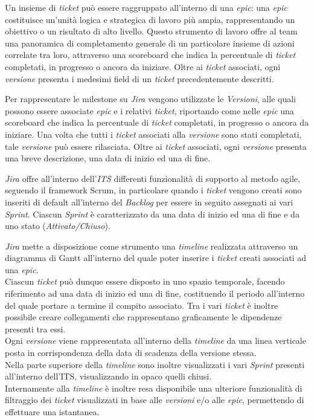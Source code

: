 \documentclass[10pt, a4paper]{article}
\begin{document}
Un insieme di \textit{ticket} può essere raggruppato all'interno di una \textit{epic}: una \textit{epic} costituisce un'unità 
logica e strategica di lavoro più ampia, rappresentando un obiettivo o un risultato di alto livello. Questo strumento di lavoro offre
al team una panoramica di completamento generale di un particolare insieme di azioni correlate tra loro, attraverso una 
scoreboard che indica la percentuale di \textit{ticket} completati, in progresso o ancora da iniziare.
Oltre ai \textit{ticket} associati, ogni \textit{versione} presenta i medesimi field di un \textit{ticket} precedentemente descritti.

Per rappresentare le milestone su \textit{Jira} vengono utilizzate le \textit{Versioni}, alle quali possono essere associate \textit{epic}
e i relativi \textit{ticket}, riportando come nelle \textit{epic} una scoreboard che indica la percentuale di \textit{ticket} completati, in progresso o ancora da iniziare.
Una volta che tutti i \textit{ticket} associati alla \textit{versione} sono stati completati, tale \textit{versione} può essere rilasciata.
Oltre ai \textit{ticket} associati, ogni \textit{versione} presenta una breve descrizione, una data di inizio ed una di fine.

\textit{Jira} offre all'interno dell'\textit{ITS} differenti funzionalità di supporto al metodo agile, seguendo il framework Scrum, in particolare
quando i \textit{ticket} vengono creati sono inseriti di default all'interno del \textit{Backlog} per essere in seguito
assegnati ai vari \textit{Sprint}. 
Ciascun \textit{Sprint} è caratterizzato da una data di inizio ed una di fine e da uno stato (\textit{Attivato/Chiuso}).

\textit{Jira} mette a disposizione come strumento una \textit{timeline} realizzata attraverso un diagramma di Gantt all'interno del quale poter inserire i \textit{ticket}
creati associati ad una \textit{epic}.\\
Ciascun \textit{ticket} può dunque essere disposto in uno spazio temporale, facendo riferimento ad una data di inizio ed una di fine, costituendo il periodo
all'interno del quale portare a termine il compito associato. Tra i vari \textit{ticket} è inoltre possibile creare collegamenti che rappresentano graficamente 
le dipendenze presenti tra essi.\\
Ogni \textit{versione} viene rappresentata all'interno della \textit{timeline} da una linea verticale posta in corrispondenza della data di scadenza
della versione stessa.\\
Nella parte superiore della \textit{timeline} sono inoltre visualizzati i vari \textit{Sprint} presenti all'interno dell'ITS, visualizzando in opaco quelli chiusi.\\
Internamente alla \textit{timeline} è inoltre resa disponibile una ulteriore funzionalità di filtraggio dei \textit{ticket} visualizzati in base alle \textit{versioni} e/o alle \textit{epic},
permettendo di effettuare una istantanea.
\end{document}
